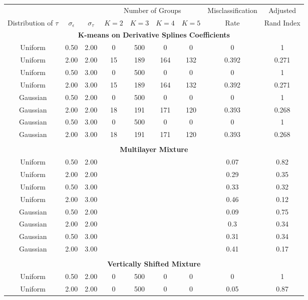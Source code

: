 \documentclass[12pt]{article}
\begin{document}
\begin{table}[ht]
\begin{center}
\begin{tabular}{ccc|cccccc}
  \hline &&&\multicolumn{4}{c}{Number of Groups}&Misclassification&Adjusted\\ Distribution of $\tau$&$\sigma_{\epsilon}$&$\sigma_{\tau}$&$K=2$&$K=3$&$K=4$&$K=5$&Rate&Rand Index\\ \hline\multicolumn{9}{c}{\textbf{K-means on Derivative Splines Coefficients}}\\ Uniform & 0.50 & 2.00 & 0 & 500 & 0 & 0 & 0 & 1 \\ 
  Uniform & 2.00 & 2.00 & 15 & 189 & 164 & 132 & 0.392 & 0.271 \\ 
  Uniform & 0.50 & 3.00 & 0 & 500 & 0 & 0 & 0 & 1 \\ 
  Uniform & 2.00 & 3.00 & 15 & 189 & 164 & 132 & 0.392 & 0.271 \\ 
  Gaussian & 0.50 & 2.00 & 0 & 500 & 0 & 0 & 0 & 1 \\ 
  Gaussian & 2.00 & 2.00 & 18 & 191 & 171 & 120 & 0.393 & 0.268 \\ 
  Gaussian & 0.50 & 3.00 & 0 & 500 & 0 & 0 & 0 & 1 \\ 
  Gaussian & 2.00 & 3.00 & 18 & 191 & 171 & 120 & 0.393 & 0.268 \\ 
   \\ \multicolumn{9}{c}{\textbf{Multilayer Mixture}}\\Uniform & 0.50 & 2.00 &  &  &  &  & 0.07 & 0.82 \\ 
  Uniform & 2.00 & 2.00 &  &  &  &  & 0.29 & 0.35 \\ 
  Uniform & 0.50 & 3.00 &  &  &  &  & 0.33 & 0.32 \\ 
  Uniform & 2.00 & 3.00 &  &  &  &  & 0.46 & 0.12 \\ 
  Gaussian & 0.50 & 2.00 &  &  &  &  & 0.09 & 0.75 \\ 
  Gaussian & 2.00 & 2.00 &  &  &  &  & 0.3 & 0.34 \\ 
  Gaussian & 0.50 & 3.00 &  &  &  &  & 0.31 & 0.34 \\ 
  Gaussian & 2.00 & 3.00 &  &  &  &  & 0.41 & 0.17 \\ 
   \\ \multicolumn{9}{c}{\textbf{Vertically Shifted Mixture}}\\Uniform & 0.50 & 2.00 & 0 & 500 & 0 & 0 & 0 & 1 \\ 
  Uniform & 2.00 & 2.00 & 0 & 500 & 0 & 0 & 0.05 & 0.87 \\ 

\end{tabular}
\end{center}
\end{table}
\end{document}
